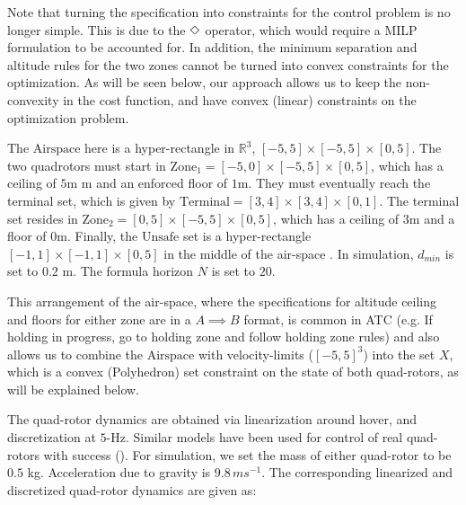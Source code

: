 Note that turning the specification into constraints for the control problem is no longer simple. 
This is due to the $\Diamond$ operator, which would require a MILP formulation to be accounted for. 
In addition, the minimum separation and altitude rules for the two zones cannot be turned into convex constraints for the optimization. As will be seen below, our approach allows us to keep the non-convexity in the cost function, and have convex (linear) constraints on the optimization problem.

The $\text{Airspace}$ here is a hyper-rectangle in $\mathbb{R}^3$, $[-5,5] \times [-5,5] \times [0,5]$.
The two quadrotors must start in $\text{Zone}_1 = [-5,0] \times [-5,5] \times [0,5]$, which has a ceiling of $5$m m and an enforced floor of $1$m. 
They must eventually reach the terminal set, which is given by $\text{Terminal} = [3,4] \times [3,4] \times [0,1]$.
The terminal set resides in $\text{Zone}_2 = [0,5] \times [-5,5] \times [0,5]$, which has a ceiling of 3m and a floor of 0m.
Finally, the $\text{Unsafe}$ set is a hyper-rectangle $[-1,1] \times [-1,1] \times [0,5]$ in the middle of the air-space
. 
In simulation, $d_{min}$ is set to $0.2$ m. 
The formula horizon $N$ is set to $20$.

This arrangement of the air-space, where the specifications for altitude ceiling and floors for either zone are in a $A \implies B$ format, is common in ATC (e.g. If holding in progress, go to holding zone and follow holding zone rules) and also allows us to combine the $\text{Airspace}$ with velocity-limits ($[-5,5]^3$) into the set $X$, which is a convex (Polyhedron) set constraint on the state of both quad-rotors, as will be explained below.

The quad-rotor dynamics are obtained via linearization around hover, and discretization at $5$-Hz. Similar models have been used for control of real quad-rotors with success (\cite{RTSS15}). For simulation, we set the mass of either quad-rotor to be $0.5$ kg. Acceleration due to gravity is $9.8\,ms^{-1}$.
The corresponding linearized and discretized quad-rotor dynamics are given as:

